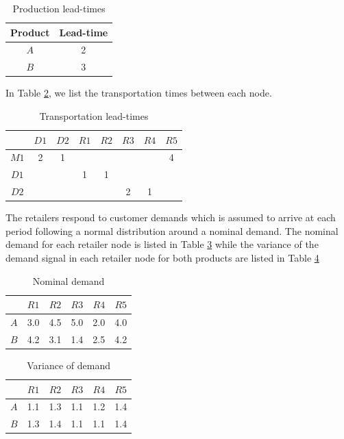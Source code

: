 \documentclass[10pt]{article}
\theoremstyle{definition}
\begin{document}
\begin{table}
\caption{Production lead-times}
\label{tab:prodlead}
\begin{center}
\begin{tabular}{cc}\toprule
Product& Lead-time \\
\midrule
$A$ & 2\\
$B$ & 3\\
\bottomrule
\end{tabular}
\end{center}
\end{table}

In Table \ref{tab:translead}, we list the transportation times between
each node. 
\begin{table}
\caption{Transportation lead-times}
\label{tab:translead}
\begin{center}
\begin{tabular}{cccccccc}\toprule
& $D1$ & $D2$  & $R1$ & $R2$ & $R3$ & $R4$ & $R5$ \\
\midrule
$M1$ &2&1& & & & &4\\
$D1$ & & &1&1& & & \\
$D2$ & & & & &2&1& \\
\bottomrule
\end{tabular}
\end{center}
\end{table}


The retailers respond to customer demands which is assumed to arrive
at each period following a normal distribution around a nominal
demand. The nominal demand for each retailer node is listed in Table
\ref{tab:nomdem} while the variance of the demand signal in each retailer node for
both products are listed in Table \ref{tab:vardem}

\begin{table}
\caption{Nominal demand}
\begin{center}
\begin{tabular}{cccccc}\toprule
\label{tab:nomdem}
 &$R1$&$R2$&$R3$&$R4$&$R5$\\
\midrule
$A$&3.0&4.5&5.0&2.0&4.0\\
$B$&4.2&3.1&1.4&2.5&4.2\\
\bottomrule
\end{tabular}
\end{center}
\end{table}

\begin{table}
\caption{Variance of  demand}
\begin{center}
\begin{tabular}{cccccc}\toprule
\label{tab:vardem}
 &$R1$&$R2$&$R3$&$R4$&$R5$\\
\midrule
$A$&1.1&1.3&1.1&1.2&1.4\\
$B$&1.3&1.4&1.1&1.1&1.4\\
\bottomrule
\end{tabular}
\end{center}
\end{table}
\end{document}
